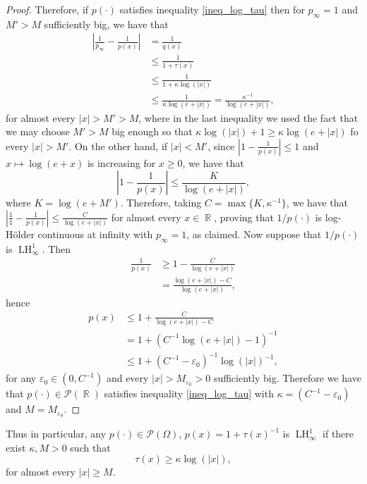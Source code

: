 \documentclass[11pt,reqno]{amsart}
\theoremstyle{definition}
\theoremstyle{definition}
\theoremstyle{definition}
\DeclareMathOperator{\R}{\mathbb{R}}
\newcommand{\p}{p(\cdot)}
\newcommand{\LH}{\operatorname{LH}_\infty^1}
\begin{document}
\begin{proof}
    Therefore, if $\p$ satisfies inequality \eqref{ineq_log_tau} then for $p_{\infty}=1$ and $M'>M$ sufficiently big, we have that
\begin{align*}
    \left|\frac{1}{p_{\infty}}-\frac{1}{p(x)}\right|&=\frac{1}{q(x)}\\
    &\leq \frac{1}{1+\tau(x)}\\
    &\leq \frac{1}{1+\kappa\log(|x|)}\\
    &\leq \frac{1}{\kappa\log(e+|x|)}=\frac{\kappa^{-1}}{\log(e+|x|)},
\end{align*}
for almost every $|x|>M'>M$, where in the last inequality we used the fact that we may choose $M'>M$ big enough so that $\kappa\log(|x|)+1\geq \kappa\log(e+|x|)$ fo every $|x|>M'$. On the other hand, if $|x|<M'$, since $ \left|1-\frac{1}{p(x)}\right|\leq 1$ and $x\mapsto\log(e+x)$ is increasing for $x\geq0$, we have that
\begin{equation*}
     \left|{1}-\frac{1}{p(x)}\right|\leq \frac{K}{\log(e+|x|)},
\end{equation*}
where $K=\log(e+M')$. Therefore, taking $C=\max\{K,\kappa^{-1}\}$, we have that $ \left|\frac{1}{1}-\frac{1}{p(x)}\right|\leq\frac{C}{\log(e+|x|)}$ for almost every $x\in\R$, proving that $1/\p$ is log-Hölder continuous at infinity with $p_\infty=1$, as claimed. Now suppose that $1/\p$ is  $\LH$. Then 
\begin{align*}
    \frac{1}{p(x)}&\geq 1-\frac{C}{\log(e+|x|)}\\
    &=\frac{\log(e+|x|)-C}{\log(e+|x|)},
\end{align*}
hence 
\begin{align*}
    p(x)&\leq 1+\frac{C}{\log(e+|x|)-C}\\
    &=1+(C^{-1}\log(e+|x|)-1)^{-1}\\
    &\leq 1+(C^{-1}-\varepsilon_0)^{-1}\log(|x|)^{-1},
\end{align*}
for any $\varepsilon_0\in (0,C^{-1})$ and every $|x|>M_{\varepsilon_0}>0$ sufficiently big. Therefore we have that $\p\in\mathcal{P}(\R)$ satisfies inequality \eqref{ineq_log_tau} with $\kappa=(C^{-1}-\varepsilon_0)$ and $M=M_{\varepsilon_0}$.
\end{proof}

Thus in particular, any $\p\in\mathcal{P}(\Omega)$, $p(x)=1+\tau(x)^{-1}$ is $\LH$ if there exist $\kappa,M>0$ such that
\begin{equation}\label{ineq_LH}
    \tau(x)\geq \kappa\log(|x|),
\end{equation}
for almost every $|x|\geq M$.
\end{document}
